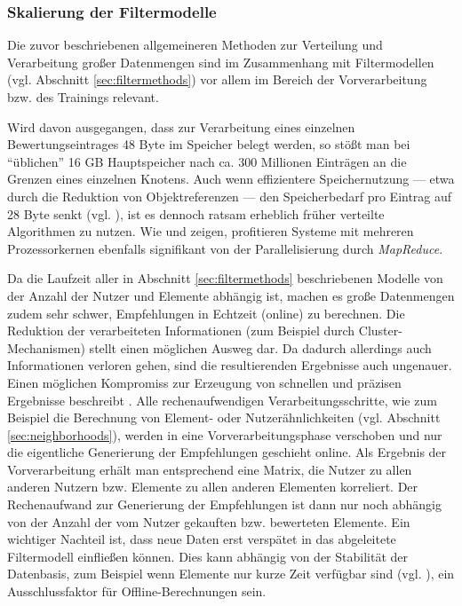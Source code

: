 \subsubsection{Skalierung der Filtermodelle}\label{sec:scalefiltering}

Die zuvor beschriebenen allgemeineren Methoden zur Verteilung und Verarbeitung großer Datenmengen sind im Zusammenhang mit Filtermodellen (vgl. Abschnitt \ref{sec:filtermethods}) vor allem im Bereich der Vorverarbeitung bzw. des Trainings relevant. 

Wird davon ausgegangen, dass zur Verarbeitung eines einzelnen Bewertungseintrages 48 Byte im Speicher belegt werden, so stößt man bei ``üblichen'' 16 GB Hauptspeicher nach ca. 300 Millionen Einträgen an die Grenzen eines einzelnen Knotens. Auch wenn effizientere Speichernutzung --- etwa durch die Reduktion von Objektreferenzen --- den Speicherbedarf pro Eintrag auf 28 Byte senkt (vgl. \citep{mia}), ist es dennoch ratsam erheblich früher verteilte Algorithmen zu nutzen. Wie \citep{mapred06} und \citep{jiang11} zeigen, profitieren Systeme mit mehreren Prozessorkernen ebenfalls signifikant von der Parallelisierung durch \textit{MapReduce}.

Da die Laufzeit aller in Abschnitt \ref{sec:filtermethods} beschriebenen Modelle von der Anzahl der Nutzer und Elemente abhängig ist, machen es große Datenmengen zudem sehr schwer, Empfehlungen in Echtzeit (online) zu berechnen. Die Reduktion der verarbeiteten Informationen (zum Beispiel durch Cluster-Mechanismen) stellt einen möglichen Ausweg dar. Da dadurch allerdings auch Informationen verloren gehen, sind die resultierenden Ergebnisse auch ungenauer. Einen möglichen Kompromiss zur Erzeugung von schnellen und präzisen Ergebnisse beschreibt \citep{linden03}. Alle rechenaufwendigen Verarbeitungsschritte, wie zum Beispiel die Berechnung von Element- oder Nutzerähnlichkeiten (vgl. Abschnitt \ref{sec:neighborhoods}), werden in eine Vorverarbeitungsphase verschoben und nur die eigentliche Generierung der Empfehlungen geschieht online. Als Ergebnis der Vorverarbeitung erhält man entsprechend eine Matrix, die Nutzer zu allen anderen Nutzern bzw. Elemente zu allen anderen Elementen korreliert. Der Rechenaufwand zur Generierung der Empfehlungen ist dann nur noch abhängig von der Anzahl der vom Nutzer gekauften bzw. bewerteten Elemente. Ein wichtiger Nachteil ist, dass neue Daten erst verspätet in das abgeleitete Filtermodell einfließen können. Dies kann abhängig von der Stabilität der Datenbasis, zum Beispiel wenn Elemente nur kurze Zeit verfügbar sind (vgl. \citep{Cornelis20074906}), ein Ausschlussfaktor für Offline-Berechnungen sein. \citep{linden03}


